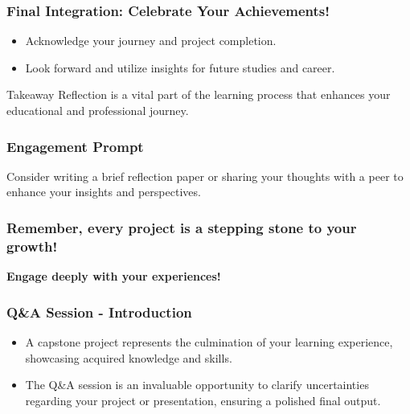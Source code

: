\documentclass[aspectratio=169]{beamer}
\begin{document}
\begin{frame}[fragile]
    \frametitle{Final Integration: Celebrate Your Achievements!}
    \begin{itemize}
        \item Acknowledge your journey and project completion.
        \item Look forward and utilize insights for future studies and career.
    \end{itemize}
    \begin{block}{Takeaway}
        Reflection is a vital part of the learning process that enhances your educational and professional journey.
    \end{block}
\end{frame}

\begin{frame}[fragile]
    \frametitle{Engagement Prompt}
    Consider writing a brief reflection paper or sharing your thoughts with a peer to enhance your insights and perspectives.
\end{frame}

\begin{frame}[fragile]
    \frametitle{Remember, every project is a stepping stone to your growth!}
    \begin{center}
        \textbf{Engage deeply with your experiences!}
    \end{center}
\end{frame}

\begin{frame}[fragile]
  \frametitle{Q\&A Session - Introduction}
  \begin{itemize}
    \item A capstone project represents the culmination of your learning experience, showcasing acquired knowledge and skills.
    \item The Q\&A session is an invaluable opportunity to clarify uncertainties regarding your project or presentation, ensuring a polished final output.
  \end{itemize}
\end{frame}
\end{document}
